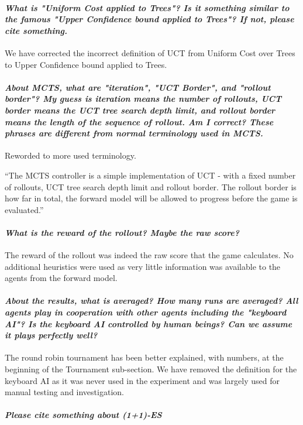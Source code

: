 \documentclass{article}
\begin{document}
\paragraph*{\textit{What is "Uniform Cost applied to Trees"? Is it something similar to the famous "Upper Confidence bound applied to Trees"? If not, please cite something.}}
We have corrected the incorrect definition of UCT from Uniform Cost over Trees to Upper Confidence bound applied to Trees.
\paragraph*{\textit{About MCTS, what are "iteration", "UCT Border", and "rollout border"? My guess is iteration means the number of rollouts,
UCT border means the UCT tree search depth limit, and rollout border means the length of the sequence of rollout. Am I correct? These phrases are different from normal terminology used in MCTS.}}
Reworded to more used terminology.

``The MCTS controller is a simple implementation of UCT - with a fixed number of rollouts, UCT tree search depth limit and rollout border. The rollout border is how far in total, the forward model will be allowed to progress before the game is evaluated.''
\paragraph*{\textit{What is the reward of the rollout? Maybe the raw score?}}
The reward of the rollout was indeed the raw score that the game calculates. No additional heuristics were used as very little information was available to the agents from the forward model.
\paragraph*{\textit{About the results, what is averaged? How many runs are averaged? All agents play in cooperation with other agents including the "keyboard AI"? Is the keyboard AI controlled by human beings? Can we assume it plays perfectly well?}}
The round robin tournament has been better explained, with numbers, at the beginning of the Tournament sub-section.
We have removed the definition for the keyboard AI as it was never used in the experiment and was largely used for manual testing and investigation.
\paragraph*{\textit{Please cite something about (1+1)-ES}}
\end{document}
